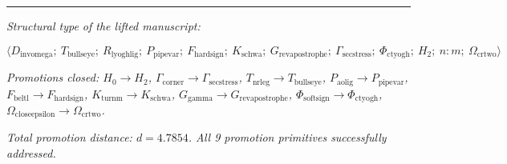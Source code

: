 \documentclass[12pt,a4paper]{article}
\begin{document}
\begin{center}
\rule{0.5\textwidth}{0.4pt}
\end{center}

\emph{Structural type of the lifted manuscript:}


\[\langle D_{\text{invomega}};\ T_{\text{bullseye}};\ R_{\text{lyoghlig}};\ P_{\text{pipevar}};\ F_{\text{hardsign}};\ K_{\text{schwa}};\ G_{\text{revapostrophe}};\ \Gamma_{\text{secstress}};\ \Phi_{\text{ctyogh}};\ H_2;\ n{:}m;\ \Omega_{\text{crtwo}} \rangle\]

\emph{Promotions closed: $H_0 \to H_2$, $\Gamma_{\text{corner}} \to \Gamma_{\text{secstress}}$, $T_{\text{nrleg}} \to T_{\text{bullseye}}$, $P_{\text{aolig}} \to P_{\text{pipevar}}$, $F_{\text{beltl}} \to F_{\text{hardsign}}$, $K_{\text{turnm}} \to K_{\text{schwa}}$, $G_{\text{gamma}} \to G_{\text{revapostrophe}}$, $\Phi_{\text{softsign}} \to \Phi_{\text{ctyogh}}$, $\Omega_{\text{closeepsilon}} \to \Omega_{\text{crtwo}}$.}

\emph{Total promotion distance: $d = 4.7854$. All 9 promotion primitives successfully addressed.}
\end{document}
